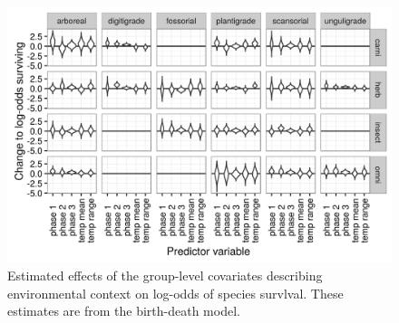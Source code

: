 \documentclass[12pt,letterpaper]{article}
\begin{document}
\begin{figure}[ht]
  \centering
  \includegraphics[width=\textwidth,height=0.5\textheight,keepaspectratio=true]{figure/group_on_survival_bd}
  \caption[Effects of group-level covariates on log-odds of ecotype survival as estimated from the the birth-death model]{Estimated effects of the group-level covariates describing environmental context on log-odds of species survlval. These estimates are from the birth-death model.}
  \label{fig:group_surv_bd}
\end{figure}
\end{document}
